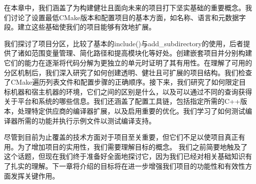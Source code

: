 在本章中，我们涵盖了为构建健壮且面向未来的项目打下坚实基础的重要概念。我们讨论了设置最低CMake版本和配置项目的基本方面，如名称、语言和元数据字段。建立这些基础使我们的项目能够有效地扩展。

我们探讨了项目分区，比较了基本的include()与add\_subdirectory的使用，后者提供了诸如范围变量管理、简化路径和提高模块化等好处。创建嵌套项目并分别构建它们的能力在逐渐将代码分解为更独立的单元时证明了其有用性。在理解了可用的分区机制后，我们深入研究了如何创建透明、健壮且可扩展的项目结构。我们检查了CMake遍历列表文件和配置步骤的正确顺序。接下来，我们研究了如何限定目标机器和宿主机器的环境，它们之间的区别是什么，以及可以通过不同的查询获得关于平台和系统的哪些信息。我们还涵盖了配置工具链，包括指定所需的C++版本，处理特定供应商的编译器扩展，以及启用重要的优化。我们学习了如何测试编译器所需的功能并执行示例文件以测试编译支持。

尽管到目前为止覆盖的技术方面对于项目至关重要，但它们不足以使项目真正有用。为了增加项目的实用性，我们需要理解目标的概念。 我们之前简要地触及了这个话题，但现在我们终于准备好全面地探讨它，因为我们已经对相关基础知识有了扎实的理解。下一章将介绍的目标将在进一步增强我们项目的功能性和有效性方面发挥关键作用。